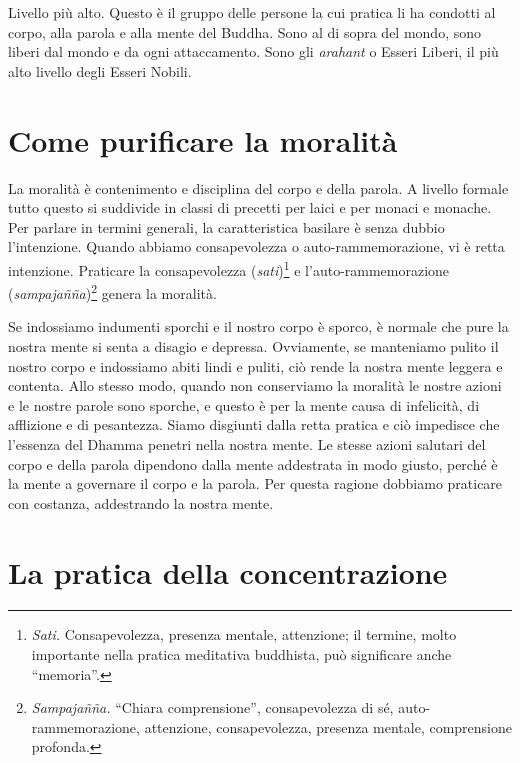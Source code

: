 Livello più alto. Questo è il gruppo delle persone la cui pratica li ha
condotti al corpo, alla parola e alla mente del Buddha. Sono al di sopra
del mondo, sono liberi dal mondo e da ogni attaccamento. Sono gli
\emph{arahant} o Esseri Liberi, il più alto livello degli Esseri Nobili.

\section{Come purificare la moralità}

La moralità è contenimento e disciplina del corpo e della parola. A
livello formale tutto questo si suddivide in classi di precetti per
laici e per monaci e monache. Per parlare in termini generali, la
caratteristica basilare è senza dubbio l'intenzione. Quando abbiamo
consapevolezza o auto-rammemorazione, vi è retta intenzione. Praticare
la consapevolezza (\emph{sati})\footnote{\emph{Sati.} Consapevolezza,
  presenza mentale, attenzione; il termine, molto importante nella
  pratica meditativa buddhista, può significare anche ``memoria''.} e
l'auto-rammemorazione (\emph{sampajañña})\footnote{\emph{Sampajañña.}
  ``Chiara comprensione'', consapevolezza di sé, auto-rammemorazione,
  attenzione, consapevolezza, presenza mentale, comprensione profonda.}
genera la moralità.

Se indossiamo indumenti sporchi e il nostro corpo è sporco, è normale
che pure la nostra mente si senta a disagio e depressa. Ovviamente, se
manteniamo pulito il nostro corpo e indossiamo abiti lindi e puliti, ciò
rende la nostra mente leggera e contenta. Allo stesso modo, quando non
conserviamo la moralità le nostre azioni e le nostre parole sono
sporche, e questo è per la mente causa di infelicità, di afflizione e di
pesantezza. Siamo disgiunti dalla retta pratica e ciò impedisce che
l'essenza del Dhamma penetri nella nostra mente. Le stesse azioni
salutari del corpo e della parola dipendono dalla mente addestrata in
modo giusto, perché è la mente a governare il corpo e la parola. Per
questa ragione dobbiamo praticare con costanza, addestrando la nostra
mente.

\section{La pratica della concentrazione}

